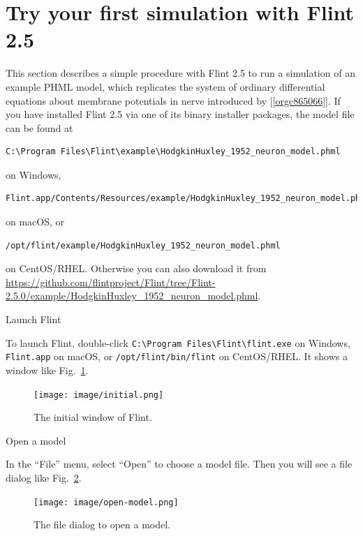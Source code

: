 \documentclass[a4paper,10pt]{report}
\begin{document}
\section{Try your first simulation with Flint 2.5}
\label{sec:org5edb8d2}
This section describes a simple procedure with Flint 2.5 to run a simulation of an
example PHML model, which replicates the system of ordinary differential
equations about membrane potentials in nerve introduced by
[\ref{orgc865066}].
If you have installed Flint 2.5 via one of its binary installer packages, the
model file can be found at
\begin{verbatim}
C:\Program Files\Flint\example\HodgkinHuxley_1952_neuron_model.phml
\end{verbatim}
on Windows,
\begin{verbatim}
Flint.app/Contents/Resources/example/HodgkinHuxley_1952_neuron_model.phml
\end{verbatim}
on macOS, or
\begin{verbatim}
/opt/flint/example/HodgkinHuxley_1952_neuron_model.phml
\end{verbatim}
on CentOS/RHEL.
Otherwise you can also download it from
\url{https://github.com/flintproject/Flint/tree/Flint-2.5.0/example/HodgkinHuxley\_1952\_neuron\_model.phml}.

\begin{description}
\item[{Launch Flint}] 
\end{description}
To launch Flint, double-click
\texttt{C:\textbackslash{}Program Files\textbackslash{}Flint\textbackslash{}flint.exe} on Windows,
\texttt{Flint.app} on macOS, or \texttt{/opt/flint/bin/flint} on CentOS/RHEL.
It shows a window like Fig.~\ref{fig:org87ed634}.
\begin{figure}[htbp]
\centering
\texttt{[image: image/initial.png]}
\caption{\label{fig:org87ed634}The initial window of Flint.}
\end{figure}

\begin{description}
\item[{Open a model}] 
\end{description}
In the ``File'' menu, select ``Open'' to choose a model file. Then you will see
a file dialog like Fig.~\ref{fig:org4e1ab7c}.

\begin{figure}[htbp]
\centering
\texttt{[image: image/open-model.png]}
\caption{\label{fig:org4e1ab7c}The file dialog to open a model.}
\end{figure}
\end{document}
